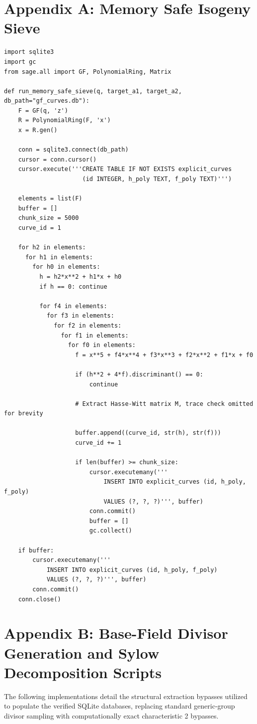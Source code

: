 \documentclass[letterpaper, 11pt]{article}
\begin{document}
\section{Appendix A: Memory Safe Isogeny Sieve}
\begin{lstlisting}
import sqlite3
import gc
from sage.all import GF, PolynomialRing, Matrix

def run_memory_safe_sieve(q, target_a1, target_a2, db_path="gf_curves.db"):
    F = GF(q, 'z')
    R = PolynomialRing(F, 'x')
    x = R.gen()
    
    conn = sqlite3.connect(db_path)
    cursor = conn.cursor()
    cursor.execute('''CREATE TABLE IF NOT EXISTS explicit_curves
                      (id INTEGER, h_poly TEXT, f_poly TEXT)''')
    
    elements = list(F)
    buffer = []
    chunk_size = 5000
    curve_id = 1
    
    for h2 in elements:
      for h1 in elements:
        for h0 in elements:
          h = h2*x**2 + h1*x + h0
          if h == 0: continue
          
          for f4 in elements:
            for f3 in elements:
              for f2 in elements:
                for f1 in elements:
                  for f0 in elements:
                    f = x**5 + f4*x**4 + f3*x**3 + f2*x**2 + f1*x + f0
                    
                    if (h**2 + 4*f).discriminant() == 0:
                        continue
                        
                    # Extract Hasse-Witt matrix M, trace check omitted for brevity
                    
                    buffer.append((curve_id, str(h), str(f)))
                    curve_id += 1
                    
                    if len(buffer) >= chunk_size:
                        cursor.executemany('''
                            INSERT INTO explicit_curves (id, h_poly, f_poly)
                            VALUES (?, ?, ?)''', buffer)
                        conn.commit()
                        buffer = []
                        gc.collect() 
                        
    if buffer:
        cursor.executemany('''
            INSERT INTO explicit_curves (id, h_poly, f_poly)
            VALUES (?, ?, ?)''', buffer)
        conn.commit()
    conn.close()
\end{lstlisting}

\section{Appendix B: Base-Field Divisor Generation and Sylow Decomposition Scripts}
The following implementations detail the structural extraction bypasses utilized to populate the verified SQLite databases, replacing standard generic-group divisor sampling with computationally exact characteristic 2 bypasses.
\end{document}
